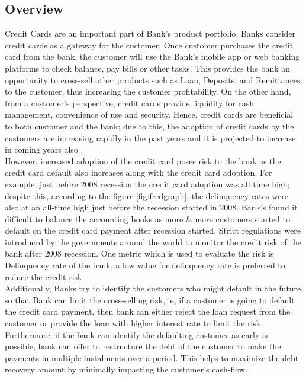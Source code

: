 \documentclass[twoside,11pt,a4paper]{article}
\begin{document}
\subsection{Overview}
Credit Cards are an important part of Bank's product portfolio. Banks consider credit cards as a gateway for the customer. Once customer purchases the credit card from the bank, the customer will use the Bank's mobile app or web banking platforms to check balance, pay bills or other tasks. This provides the bank an opportunity to cross-sell other products such as Loan, Deposits, and Remittances to the customer, thus increasing the customer profitability. On the other hand, from a customer's perspective, credit cards provide liquidity for cash management, convenience of use and security. Hence, credit cards are beneficial to both customer and the bank; due to this, the adoption of credit cards by the customers are increasing rapidly in the past years and it is projected to increase in coming years also \citep{global2022cardpayments}.\\

However, increased adoption of the credit card poses risk to the bank as the credit card default also increases along with the credit card adoption. For example, just before 2008 recession the credit card adoption was all time high; despite this, according to the  figure \ref{fig:fredgraph}, the delinquency rates were also at an all-time high just before the recession started in 2008. Bank's found it difficult to balance the accounting books as more \& more customers started to default on the credit card payment after recession started. Strict regulations were introduced by the governments around the world to monitor the credit risk of the bank after 2008 recession. One metric which is used to evaluate the risk is Delinquency rate of the bank, a low value for delinquency rate is preferred to reduce the credit risk.\\

Additionally, Banks try to identify the customers who might default in the future so that Bank can limit the cross-selling risk, ie, if a customer is going to default the credit card payment, then bank can either reject the loan request from the customer or provide the loan with higher interest rate to limit the risk. Furthermore, if the bank can identify the defaulting customer as early as possible, bank can offer to restructure the debt of the customer to make the payments in multiple instalments over a period. This helps to maximize the debt recovery  amount by minimally impacting the customer's cash-flow. 
\end{document}
